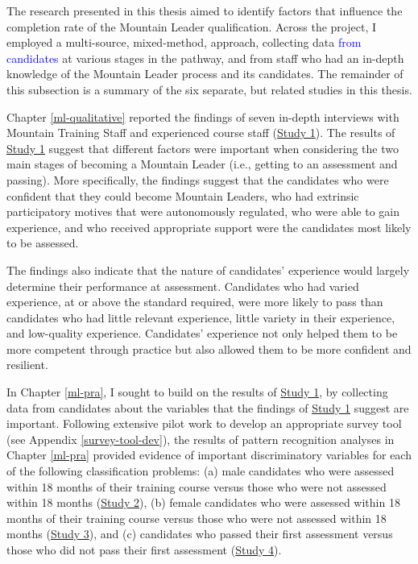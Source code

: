 \documentclass[
  12pt,
  a4paper,
]{book}
\begin{document}
The research presented in this thesis aimed to identify factors that influence the completion rate of the Mountain Leader qualification. Across the project, I employed a multi-source, mixed-method, approach, collecting data \textcolor{blue}{from candidates} at various stages in the pathway, and from staff who had an in-depth knowledge of the Mountain Leader process and its candidates. The remainder of this subsection is a summary of the six separate, but related studies in this thesis.

Chapter \ref{ml-qualitative} reported the findings of seven in-depth interviews with Mountain Training Staff and experienced course staff (\protect\hyperlink{ml-qualitative}{Study 1}). The results of \protect\hyperlink{ml-qualitative}{Study 1} suggest that different factors were important when considering the two main stages of becoming a Mountain Leader (i.e., getting to an assessment and passing). More specifically, the findings suggest that the candidates who were confident that they could become Mountain Leaders, who had extrinsic participatory motives that were autonomously regulated, who were able to gain experience, and who received appropriate support were the candidates most likely to be assessed.

The findings also indicate that the nature of candidates' experience would largely determine their performance at assessment. Candidates who had varied experience, at or above the standard required, were more likely to pass than candidates who had little relevant experience, little variety in their experience, and low-quality experience. Candidates' experience not only helped them to be more competent through practice but also allowed them to be more confident and resilient.

In Chapter \ref{ml-pra}, I sought to build on the results of \protect\hyperlink{ml-qualitative}{Study 1}, by collecting data from candidates about the variables that the findings of \protect\hyperlink{ml-qualitative}{Study 1} suggest are important. Following extensive pilot work to develop an appropriate survey tool (see Appendix \ref{survey-tool-dev}), the results of pattern recognition analyses in Chapter \ref{ml-pra} provided evidence of important discriminatory variables for each of the following classification problems: (a) male candidates who were assessed within 18 months of their training course versus those who were not assessed within 18 months (\protect\hyperlink{male-gta}{Study 2}), (b) female candidates who were assessed within 18 months of their training course versus those who were not assessed within 18 months (\protect\hyperlink{female-gta}{Study 3}), and (c) candidates who passed their first assessment versus those who did not pass their first assessment (\protect\hyperlink{ftp}{Study 4}).
\end{document}
